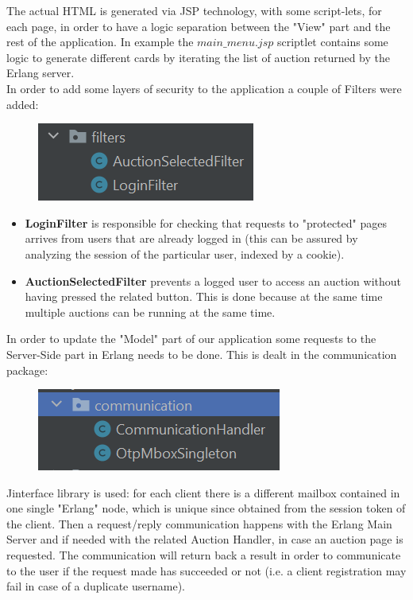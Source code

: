 The actual HTML is generated via JSP technology, with some script-lets, for each page, in order to have a logic separation between the "View" part and the rest of the application. In example the $main\_menu.jsp$ scriptlet contains some logic to generate different cards by iterating the list of auction returned by the Erlang server.\\

\noindent In order to add some layers of security to the application a couple of Filters were added:\\
\begin{figure}[H]
	\centering
	\includegraphics[width=0.4\linewidth]{img/filters}
	\caption{}
	\label{fig:filters}
\end{figure}
\begin{itemize}
	\item \textbf{LoginFilter} is responsible for checking that requests to "protected" pages arrives from users that are already logged in (this can be assured by analyzing the session of the particular user, indexed by a cookie).
		
	\item \textbf{AuctionSelectedFilter} prevents a logged user to access an auction without having pressed the related button. This is done because at the same time multiple auctions can be running at the same time.\\
	
\end{itemize}
In order to update the "Model" part of our application some requests to the Server-Side part in Erlang needs to be done. This is dealt in the communication package:

\begin{figure}[H]
	\centering
	\includegraphics[width=0.4\linewidth]{img/communication}
	\caption{}
	\label{fig:communication}
\end{figure}

Jinterface library is used: for each client there is a different mailbox contained in one single "Erlang" node, which is unique since obtained from the session token of the client. Then a request/reply communication happens with the Erlang Main Server and if needed with the related Auction Handler, in case an auction page is requested. The communication will return back a result in order to communicate to the user if the request made has succeeded or not (i.e. a client registration may fail in case of a duplicate username).
